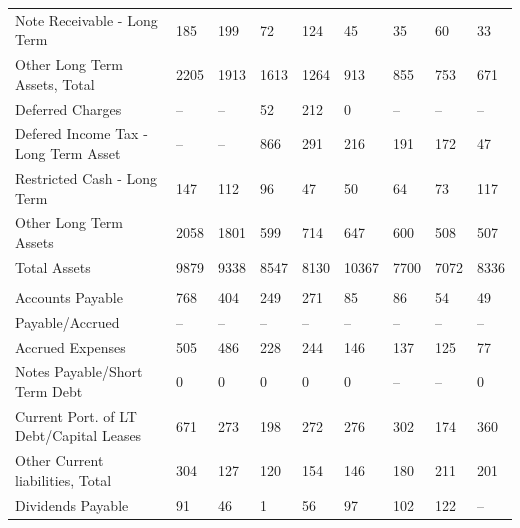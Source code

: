 \documentclass[grad,numbers]{coppe}
\begin{document}
\begin{longtable}[t]{lllllllll}
  \hspace{1em}Note Receivable - Long Term & 185 & 199 & 72 & 124 & 45 & 35 & 60 & 33\\
  \hspace{1em}Other Long Term Assets, Total & 2205 & 1913 & 1613 & 1264 & 913 & 855 & 753 & 671\\
  \hspace{1em}\hspace{1em}Deferred Charges & -- & -- & 52 & 212 & 0 & -- & -- & --\\
  \hspace{1em}\hspace{1em}Defered Income Tax - Long Term Asset & -- & -- & 866 & 291 & 216 & 191 & 172 & 47\\
  \hspace{1em}\hspace{1em}Restricted Cash - Long Term & 147 & 112 & 96 & 47 & 50 & 64 & 73 & 117\\
  \hspace{1em}\hspace{1em}Other Long Term Assets & 2058 & 1801 & 599 & 714 & 647 & 600 & 508 & 507\\
  \hspace{1em}Total Assets & 9879 & 9338 & 8547 & 8130 & 10367 & 7700 & 7072 & 8336\\
  \addlinespace[0.3em]
  \multicolumn{9}{l}{\textbf{Liabilities}}\\
  \hspace{1em}Accounts Payable & 768 & 404 & 249 & 271 & 85 & 86 & 54 & 49\\
  \hspace{1em}Payable/Accrued & -- & -- & -- & -- & -- & -- & -- & --\\
  \hspace{1em}Accrued Expenses & 505 & 486 & 228 & 244 & 146 & 137 & 125 & 77\\
  \hspace{1em}Notes Payable/Short Term Debt & 0 & 0 & 0 & 0 & 0 & -- & -- & 0\\
  \hspace{1em}Current Port. of LT Debt/Capital Leases & 671 & 273 & 198 & 272 & 276 & 302 & 174 & 360\\
  \hspace{1em}Other Current liabilities, Total & 304 & 127 & 120 & 154 & 146 & 180 & 211 & 201\\
  \hspace{1em}\hspace{1em}Dividends Payable & 91 & 46 & 1 & 56 & 97 & 102 & 122 & --\\

\end{longtable}
\end{document}
